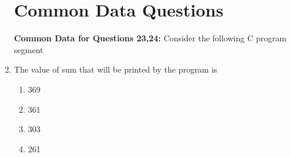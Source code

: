 \documentclass[journal,12pt,onecolumn]{IEEEtran}
\theoremstyle{remark}
\begin{document}
\begin{enumerate}
\section{Common Data Questions}
\textbf{Common Data for Questions 23,24:}
Consider the following C program segment

\item The value of sum that will be printed by the program is
\begin{multicols}{4}
\begin{enumerate}
\item 369
\item 361
\item 303
\item 261
\end{enumerate} 
\end{multicols}

\end{enumerate}
\end{document}
